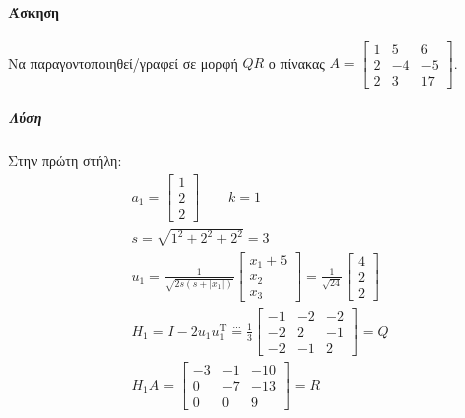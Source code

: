 \documentclass[11pt,a4paper,notitlepage,fleqn,final]{article}
\begin{document}
\paragraph{Άσκηση}
Να παραγοντοποιηθεί/γραφεί σε μορφή \( QR \) ο πίνακας \( A =
\left[\begin{matrix}
1&5&6\\2&-4&-5\\2&3&17
\end{matrix}\right] \).
\subparagraph{Λύση}
Στην πρώτη στήλη:
\begin{gather*}
	a_1 = \left[\begin{matrix}
	1\\2\\2
	\end{matrix}\right] \qquad k=1 \\
	s=\sqrt{1^2+2^2+2^2}=3 \\
	u_1 = \frac{1}{\sqrt{2s(s+|x_1|)}}\left[\begin{matrix}
	x_1+5\\x_2\\x_3
	\end{matrix}\right] = \frac{1}{\sqrt{24}}\left[\begin{matrix}
	4\\2\\2
	\end{matrix}\right] \\
	H_1 = I-2u_1u_1^{\mathrm T} \overset{\cdots}{=}
	\frac{1}{3}\left[\begin{matrix}
	-1&-2&-2\\-2&2&-1\\-2&-1&2
	\end{matrix}\right] = Q \\
	H_1A = \left[\begin{matrix}
	-3&-1&-10\\0&-7&-13\\0&0&9
	\end{matrix}\right] = R
\end{gather*}
\end{document}
